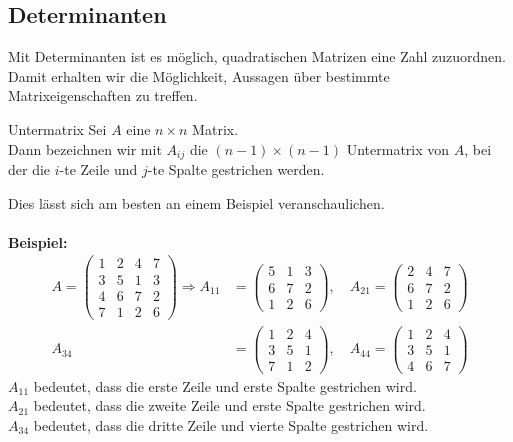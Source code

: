\subsection{Determinanten}
Mit Determinanten ist es möglich, quadratischen Matrizen eine Zahl zuzuordnen.
Damit erhalten wir die Möglichkeit, Aussagen über bestimmte Matrixeigenschaften zu treffen.
\begin{mybox}{Untermatrix}
Sei $A$ eine $n \times n$ Matrix.\\
Dann bezeichnen wir mit $A_{ij}$ die $(n-1) \times (n-1)$ Untermatrix von $A$, bei 
der die $i$-te Zeile und $j$-te Spalte gestrichen werden.
\end{mybox}
Dies lässt sich am besten an einem Beispiel veranschaulichen.\\ \\
\textbf{Beispiel:}
\begin{align*}
A=
\begin{pmatrix}
1 & 2& 4 &7 \\
3 & 5 & 1 & 3\\
4 & 6 & 7 & 2\\
7 & 1 & 2 & 6
\end{pmatrix}
\Rightarrow
A_{11}
&=
\begin{pmatrix}
5 & 1 & 3\\
6 & 7 & 2 \\
1 & 2 & 6
\end{pmatrix}, \quad
A_{21}
=
\begin{pmatrix}
2 & 4 & 7 \\
6 & 7 & 2 \\
1 & 2 & 6
\end{pmatrix}\\
A_{34}
&=
\begin{pmatrix}
1 & 2 & 4 \\
3 & 5 & 1 \\
7 & 1 & 2
\end{pmatrix}, \quad
A_{44}
=
\begin{pmatrix}
1 & 2 & 4 \\
3 & 5 & 1 \\
4 & 6 & 7
\end{pmatrix}
\end{align*}
$A_{11}$ bedeutet, dass die erste Zeile und erste Spalte gestrichen wird.\\
$A_{21}$ bedeutet, dass die zweite Zeile und erste Spalte gestrichen wird.\\
$A_{34}$ bedeutet, dass die dritte Zeile und vierte Spalte gestrichen wird.\\
